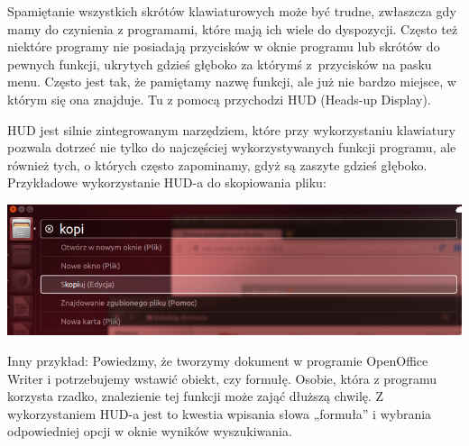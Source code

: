 Spamiętanie wszystkich skrótów klawiaturowych może być trudne, zwłaszcza gdy mamy do czynienia z programami, które mają ich wiele do dyspozycji. Często też niektóre programy nie posiadają przycisków w oknie programu lub skrótów do pewnych funkcji, ukrytych gdzieś głęboko za którymś z~przycisków na pasku menu. Często jest tak, że pamiętamy nazwę funkcji, ale już nie bardzo miejsce, w którym się ona znajduje. Tu z pomocą przychodzi \textcolor{ubuntu_orange}{HUD} (Heads-up Display).

HUD jest silnie zintegrowanym narzędziem, które przy wykorzystaniu klawiatury pozwala dotrzeć nie tylko do najczęściej wykorzystywanych funkcji programu, ale również tych, o których często zapominamy, gdyż są zaszyte gdzieś głęboko. Przykładowe wykorzystanie HUD-a do skopiowania pliku:

\begin{center}
	\includegraphics[width=\linewidth]{images/unity_hud1.png}
\end{center}

Inny przykład: Powiedzmy, że tworzymy dokument w programie OpenOffice Writer i potrzebujemy wstawić obiekt, czy formułę. Osobie, która z programu korzysta rzadko, znalezienie tej funkcji może zająć dłuższą chwilę. Z wykorzystaniem HUD-a jest to kwestia wpisania słowa „formuła” i wybrania odpowiedniej opcji w oknie wyników wyszukiwania.